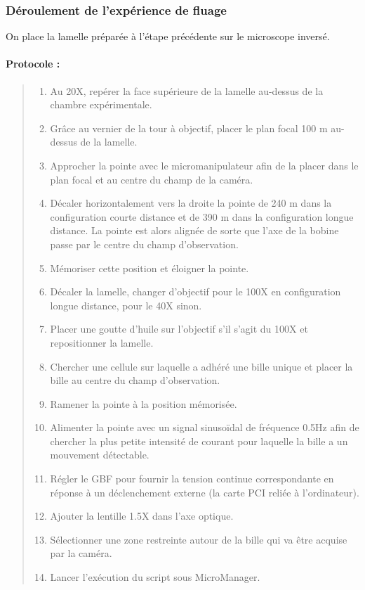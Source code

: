 	\subsubsection{Déroulement de l'expérience de fluage}
	
	On place la lamelle préparée à l'étape précédente sur le microscope inversé. 
	\paragraph{Protocole : }
	\begin{quote}
	\begin{enumerate}
	\item Au 20X, repérer la face supérieure de la lamelle au-dessus de la chambre expérimentale.
	\item Grâce au vernier de la tour à objectif, placer le plan focal 100 \micro m au-dessus de la lamelle. 
	\item Approcher la pointe avec le micromanipulateur afin de la placer dans le plan focal et au centre du champ de la caméra. 
	\item Décaler horizontalement vers la droite la pointe de 240 \micro m dans la configuration courte distance et de 390 \micro m dans la configuration longue distance. La pointe est alors alignée de sorte que l'axe de la bobine passe par le centre du champ d'observation. 
	\item Mémoriser cette position et éloigner la pointe.
	\item Décaler la lamelle, changer d'objectif pour le 100X en configuration longue distance, pour le 40X sinon.
	\item Placer une goutte d'huile sur l'objectif s'il s'agit du 100X et repositionner la lamelle. 
	\item Chercher une cellule sur laquelle a adhéré une bille unique et placer la bille au centre du champ d'observation.
	\item Ramener la pointe à la position mémorisée.
	\item Alimenter la pointe avec un signal sinusoïdal de fréquence 0.5Hz afin de chercher la plus petite intensité de courant pour laquelle la bille a un mouvement détectable. 
	\item Régler le GBF pour fournir la tension continue correspondante en réponse à un déclenchement externe (la carte PCI reliée à l'ordinateur). 
	\item Ajouter la lentille 1.5X dans l'axe optique.
	\item Sélectionner une zone restreinte autour de la bille qui va être acquise par la caméra.
	\item Lancer l'exécution du script sous MicroManager.
	\end{enumerate}
	\end{quote}
	
